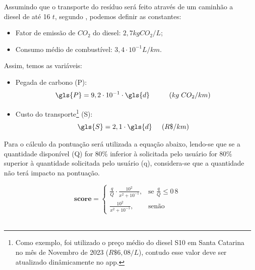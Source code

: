 Assumindo que o transporte do resíduo será feito através de um caminhão a diesel de até 16 \ensuremath{t}, segundo \textcite{bartholomeu_quantificacao_2006}, podemos definir as constantes:

\begin{itemize} 
	\item Fator de emissão de $CO_{2}$ do diesel: $2,7 kg CO_{2}/L $;
  \item Consumo médio de combustível: $ 3,4 \cdot 10^{-1} L/km $.
\end{itemize}

Assim, temos as variáveis: 

\begin{itemize} 
	\item Pegada de carbono (\gls{P}): 
  \begin{equation}\label{eq:Eq_1}
    \gls{P} = 9,2 \cdot 10^{-1} \cdot \gls{d} \hspace{10mm} (\ensuremath{kg} \hspace{1mm} CO_{2}/\ensuremath{km})
  \end{equation}
	\item Custo do transporte\footnote{Como exemplo, foi utilizado o preço médio do diesel S10 em Santa Catarina no mês de Novembro de 2023 ($R\$6,08/$\ensuremath{L}), contudo esse valor deve ser atualizado dinâmicamente no app.} (S): 
  \begin{equation}\label{eq:custo} 
    \gls{S} = 2,1 \cdot \gls{d} \hspace{5mm} (R\$/\ensuremath{km})
  \end{equation}  
\end{itemize}

Para o cálculo da pontuação será utilizada a equação abaixo, lendo-se que se a quantidade disponível (\gls{Q}) for 80\% inferior à solicitada pelo usuário  for 80\% superior à quantidade solicitada pelo usuário (\gls{q}), considera-se que a quantidade não terá impacto na pontuação.

\begin{equation}\label{eq:pont}
      \textbf{score} = 
  \begin{cases}
      \frac{q}{Q} \cdot \frac{10^2}{x^2 + 10^{-1}},& \text{se } \frac{q}{Q} \leq 0\,8\\
      \frac{10^2}{x^2 + 10^{-1}},              & \text{senão}
  \end{cases}
\end{equation}
\\
